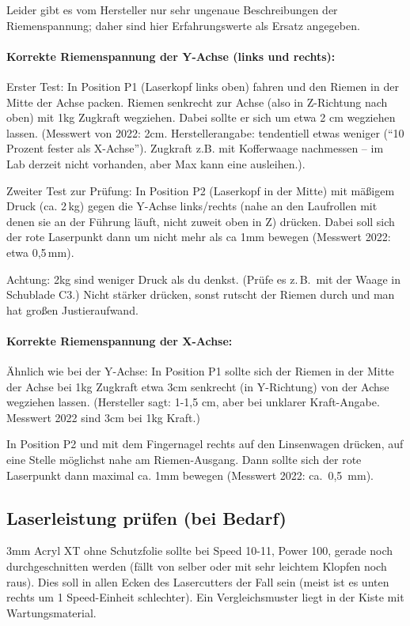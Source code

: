 \documentclass{\basedir/fablab-document}
\begin{document}
	Leider gibt es vom Hersteller nur sehr ungenaue Beschreibungen der Riemenspannung; daher sind hier Erfahrungswerte als Ersatz angegeben.

	\paragraph{Korrekte Riemenspannung der Y-Achse (links und rechts):} Erster Test: In Position P1 (Laserkopf links oben) fahren und den Riemen in der Mitte der Achse packen. Riemen senkrecht zur Achse (also in Z-Richtung nach oben) mit 1kg Zugkraft wegziehen. Dabei sollte er sich um etwa 2 cm wegziehen lassen. (Messwert von 2022: 2cm. Herstellerangabe: tendentiell etwas weniger (\enquote{10 Prozent fester als X-Achse}). Zugkraft z.B. mit Kofferwaage nachmessen -- im Lab derzeit nicht vorhanden, aber Max kann eine ausleihen.).

	Zweiter Test zur Prüfung: In Position P2 (Laserkopf in der Mitte) mit mäßigem Druck (ca. 2\,kg) gegen die Y-Achse links/rechts (nahe an den Laufrollen mit denen sie an der Führung läuft, nicht zuweit oben in Z) drücken. Dabei soll sich der rote Laserpunkt dann um nicht mehr als ca 1mm bewegen (Messwert 2022: etwa 0,5\,mm).

	Achtung: 2kg sind weniger Druck als du denkst. (Prüfe es z.\,B.\ mit der Waage in Schublade C3.) Nicht stärker drücken, sonst rutscht der Riemen durch und man hat großen Justieraufwand.

	
	\paragraph{Korrekte Riemenspannung der X-Achse:} Ähnlich wie bei der Y-Achse: In Position P1 sollte sich der Riemen in der Mitte der Achse bei 1kg Zugkraft etwa 3cm senkrecht (in Y-Richtung) von der Achse wegziehen lassen. (Hersteller sagt: 1-1,5 cm, aber bei unklarer Kraft-Angabe. Messwert 2022 sind 3cm bei 1kg Kraft.)
	
	In Position P2 und mit dem Fingernagel rechts auf den Linsenwagen drücken, auf eine Stelle möglichst nahe am Riemen-Ausgang. Dann sollte sich der rote Laserpunkt dann maximal ca. 1mm bewegen (Messwert 2022: ca.\ 0,5\, mm).
	

\subsection{Laserleistung prüfen (bei Bedarf)}
3mm Acryl XT ohne Schutzfolie sollte bei Speed 10-11, Power 100, gerade noch durchgeschnitten werden (fällt von selber oder mit sehr leichtem Klopfen noch raus). Dies soll in allen Ecken des Lasercutters der Fall sein (meist ist es unten rechts um 1 Speed-Einheit schlechter). Ein Vergleichsmuster liegt in der Kiste mit Wartungsmaterial.
\end{document}

